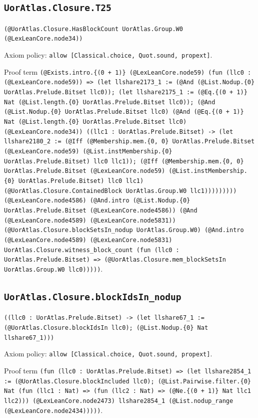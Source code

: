 \documentclass[11pt]{article}
\begin{document}
\subsection*{\texttt{UorAtlas.Closure.T25}}
\noindent\texttt{(@UorAtlas.Closure.HasBlockCount UorAtlas.Group.W0 (@LexLeanCore.node34))}\par
\noindent Axiom policy: \texttt{allow [Classical.choice, Quot.sound, propext]}.\par
\noindent Proof term \texttt{(@Exists.intro.\{(0 + 1)\} (@LexLeanCore.node59) (fun (llc0 : (@LexLeanCore.node59)) => (let llshare2173\_1 := (@And (@List.Nodup.\{0\} UorAtlas.Prelude.Bitset llc0)); (let llshare2175\_1 := (@Eq.\{(0 + 1)\} Nat (@List.length.\{0\} UorAtlas.Prelude.Bitset llc0)); (@And (@List.Nodup.\{0\} UorAtlas.Prelude.Bitset llc0) (@And (@Eq.\{(0 + 1)\} Nat (@List.length.\{0\} UorAtlas.Prelude.Bitset llc0) (@LexLeanCore.node34)) ((llc1 : UorAtlas.Prelude.Bitset) -> (let llshare2180\_2 := (@Iff (@Membership.mem.\{0, 0\} UorAtlas.Prelude.Bitset (@LexLeanCore.node59) (@List.instMembership.\{0\} UorAtlas.Prelude.Bitset) llc0 llc1)); (@Iff (@Membership.mem.\{0, 0\} UorAtlas.Prelude.Bitset (@LexLeanCore.node59) (@List.instMembership.\{0\} UorAtlas.Prelude.Bitset) llc0 llc1) (@UorAtlas.Closure.ContainedBlock UorAtlas.Group.W0 llc1))))))))) (@LexLeanCore.node4586) (@And.intro (@List.Nodup.\{0\} UorAtlas.Prelude.Bitset (@LexLeanCore.node4586)) (@And (@LexLeanCore.node4589) (@LexLeanCore.node5831)) (@UorAtlas.Closure.blockSetsIn\_nodup UorAtlas.Group.W0) (@And.intro (@LexLeanCore.node4589) (@LexLeanCore.node5831) UorAtlas.Closure.witness\_block\_count (fun (llc0 : UorAtlas.Prelude.Bitset) => (@UorAtlas.Closure.mem\_blockSetsIn UorAtlas.Group.W0 llc0)))))}.\par
\subsection*{\texttt{UorAtlas.Closure.blockIdsIn\_nodup}}
\noindent\texttt{((llc0 : UorAtlas.Prelude.Bitset) -> (let llshare67\_1 := (@UorAtlas.Closure.blockIdsIn llc0); (@List.Nodup.\{0\} Nat llshare67\_1)))}\par
\noindent Axiom policy: \texttt{allow [Classical.choice, Quot.sound, propext]}.\par
\noindent Proof term \texttt{(fun (llc0 : UorAtlas.Prelude.Bitset) => (let llshare2854\_1 := (@UorAtlas.Closure.blockIncluded llc0); (@List.Pairwise.filter.\{0\} Nat (fun (llc1 : Nat) => (fun (llc2 : Nat) => (@Ne.\{(0 + 1)\} Nat llc1 llc2))) (@LexLeanCore.node2473) llshare2854\_1 (@List.nodup\_range (@LexLeanCore.node2434)))))}.\par
\end{document}
